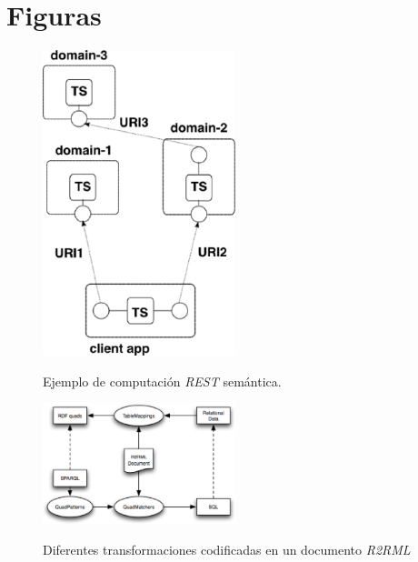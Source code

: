 \chapter{Figuras}

\vspace*{-3in}

\begin{figure}
\vspace{2.4in}
\caption{Ejemplo de computaci\'on \textit{REST} sem\'antica.}
\includegraphics[width=0.5\textwidth]{figura1}
\label{figura1}
\end{figure}

\clearpage
\newpage

\vspace*{-3in}

\begin{figure}
\vspace{2.4in}
\caption{Diferentes transformaciones codificadas en un documento \textit{R2RML}}
\includegraphics[width=0.5\textwidth]{figura2}
\label{figura2}
\end{figure}

\clearpage
\newpage

